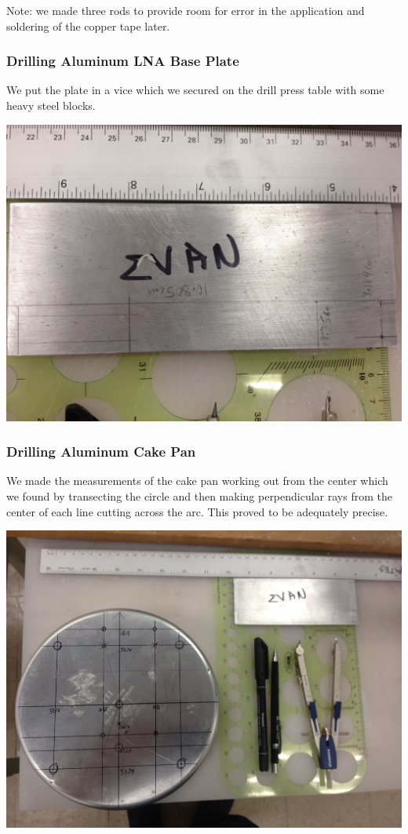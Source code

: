 \documentclass[11pt]{article} %
\begin{document}
Note: we made three rods to provide room for error in the application and soldering of the copper tape later.

\subsubsection{Drilling Aluminum LNA Base Plate}

We put the plate in a vice which we secured on the drill press table with some heavy steel blocks.

\begin{center}
\includegraphics[scale=0.12]{feed/03.jpeg}
\end{center}

\subsubsection{Drilling Aluminum Cake Pan}

We made the measurements of the cake pan working out from the center which we found by transecting the circle and then making perpendicular rays from the center of each line cutting across the arc. This proved to be adequately precise. 

\begin{center}
\includegraphics[scale=0.11]{feed/04.jpeg}
\end{center}
\end{document}
